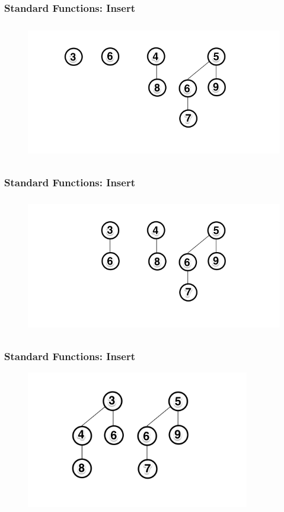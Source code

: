 \documentclass[13pt]{beamer}
\begin{document}
\begin{frame}
\frametitle{Standard Functions: Insert}

  \begin{figure}
    \includegraphics[height=6cm]{./img/insertA.png}
  \end{figure}

\end{frame}

\begin{frame}
\frametitle{Standard Functions: Insert}

  \begin{figure}
    \includegraphics[height=6cm]{./img/insertB.png}
  \end{figure}

\end{frame}

\begin{frame}
\frametitle{Standard Functions: Insert}

  \begin{figure}
    \includegraphics[height=6cm]{./img/insertC.png}
  \end{figure}


\end{frame}
\end{document}
